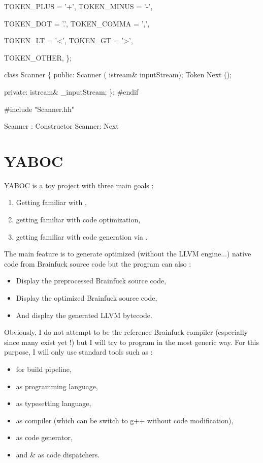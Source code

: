         TOKEN_PLUS      = '+',
        TOKEN_MINUS     = '-',

        TOKEN_DOT       = '.',
        TOKEN_COMMA     = ',',

        TOKEN_LT        = '<',
        TOKEN_GT        = '>',

        TOKEN_OTHER,
\};

class Scanner \{
        public:
                Scanner ( istream& inputStream);
                Token Next ();

        private:
                istream& _inputStream;
\};
#endif
\nwendcode{}\nwdocspar

\nwenddocs{}\endmoddef\nwstartdeflinemarkup\nwenddeflinemarkup
#include "Scanner.hh"

\LA{}Scanner : Constructor\RA{}
\LA{}Scanner: Next\RA{}
\nwendcode{}\nwdocspar
\nwenddocs{}\section{YABOC}
\gls{YABOC} is a toy project with three main goals :
\begin{enumerate}
        \item Getting familiar with ,
        \item getting familiar with code optimization,
        \item getting familiar with code generation via .
\end{enumerate}
The main feature is to generate optimized (without the LLVM engine$\ldots$) native code from Brainfuck source code but the program can also :
\begin{itemize}
        \item Display the preprocessed Brainfuck source code,
        \item Display the optimized Brainfuck source code,
        \item And display the generated LLVM bytecode.
\end{itemize}

\newpar Obviously, I do not attempt to be the reference Brainfuck compiler (especially since many exist yet !) but I will try to program in the most generic way. For this purpose, I will only use standard tools such as :
\begin{itemize}
        \item {} for build pipeline,
        \item {} as programming language,
        \item \tbf{\LaTeX} as typesetting language,
        \item {} as compiler (which can be switch to g++ without code modification),
        \item {} as code generator,
        \item and  \&  as code dispatchers.
\end{itemize}

